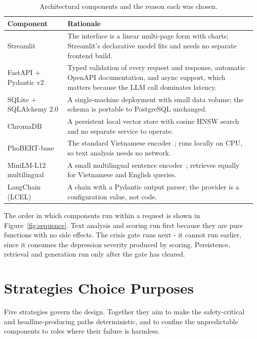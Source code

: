 \begin{table}[ht]
	\centering
	\caption{Architectural components and the reason each was chosen.}
	\label{tab:components}
	\begin{tabularx}{\textwidth}{lL}
		\toprule
		Component & Rationale \\ \midrule
		Streamlit & The interface is a linear multi-page form with charts; Streamlit's declarative model fits and needs no separate frontend build. \\
		FastAPI + Pydantic v2 & Typed validation of every request and response, automatic OpenAPI documentation, and async support, which matters because the LLM call dominates latency. \\
		SQLite + SQLAlchemy 2.0 & A single-machine deployment with small data volume; the schema is portable to PostgreSQL unchanged. \\
		ChromaDB & A persistent local vector store with cosine HNSW search and no separate service to operate. \\
		PhoBERT-base & The standard Vietnamese encoder~\cite{nguyen2020phobert}; runs locally on CPU, so text analysis needs no network. \\
		MiniLM-L12 multilingual & A small multilingual sentence encoder~\cite{reimers2020multilingual}; retrieves equally for Vietnamese and English queries. \\
		LangChain (LCEL) & A  chain with a Pydantic output parser; the provider is a configuration value, not code. \\ \bottomrule
	\end{tabularx}
\end{table}

The order in which components run within a request is shown in Figure~\ref{fig:sequence}. Text analysis and scoring run first because they are pure functions with no side effects. The crisis gate runs next - it cannot run earlier, since it consumes the depression severity produced by scoring. Persistence, retrieval and generation run only after the gate has cleared.


\section{Strategies Choice Purposes}
Five strategies govern the design. Together they aim to make the safety-critical and headline-producing paths deterministic, and to confine the unpredictable components to roles where their failure is harmless.

